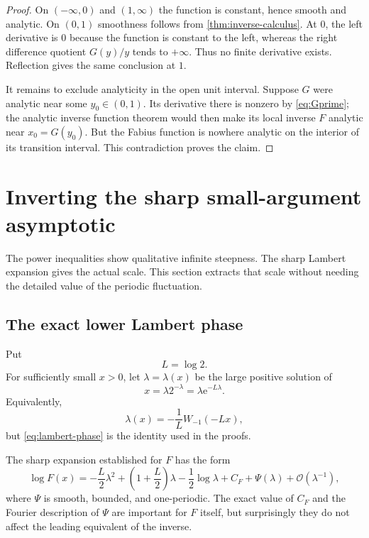 \documentclass[11pt,oneside]{article}
\theoremstyle{definition}
\theoremstyle{remark}
\newcommand{\e}{\mathrm e}
\newcommand{\bigO}{\mathcal O}
\newcommand{\InvF}{G}
\begin{document}
\begin{proof}
On $(-\infty,0)$ and $(1,\infty)$ the function is constant, hence smooth
and analytic.  On $(0,1)$ smoothness follows from
\cref{thm:inverse-calculus}.  At $0$, the left derivative is $0$ because
the function is constant to the left, whereas the right difference
quotient $\InvF(y)/y$ tends to $+\infty$.  Thus no finite derivative
exists.  Reflection gives the same conclusion at $1$.

It remains to exclude analyticity in the open unit interval.  Suppose
$\InvF$ were analytic near some $y_0\in(0,1)$.  Its derivative there is
nonzero by \eqref{eq:Gprime}; the analytic inverse function theorem would
then make its local inverse $F$ analytic near $x_0=\InvF(y_0)$.  But the
Fabius function is nowhere analytic on the interior of its transition
interval.  This contradiction proves the claim.
\end{proof}

\section{Inverting the sharp small-argument asymptotic}
\label{sec:inverse-asymptotic}

The power inequalities show qualitative infinite steepness.  The sharp
Lambert expansion gives the actual scale.  This section extracts that
scale without needing the detailed value of the periodic fluctuation.

\subsection{The exact lower Lambert phase}

Put
\[
 L=\log2.
\]
For sufficiently small $x>0$, let $\lambda=\lambda(x)$ be the large
positive solution of
\begin{equation}
 x=\lambda2^{-\lambda}
   =\lambda\e^{-L\lambda}. \label{eq:lambert-phase}
\end{equation}
Equivalently,
\[
 \lambda(x)=-\frac1L W_{-1}(-Lx),
\]
but \eqref{eq:lambert-phase} is the identity used in the proofs.

The sharp expansion established for $F$ has the form
\begin{equation}
 \log F(x)
 =-\frac L2\lambda^2+
   \left(1+\frac L2\right)\lambda
   -\frac12\log\lambda
   +C_F+\Psi(\lambda)
   +\bigO(\lambda^{-1}), \label{eq:sharp-input}
\end{equation}
where $\Psi$ is smooth, bounded, and one-periodic.  The exact value of
$C_F$ and the Fourier description of $\Psi$ are important for $F$ itself,
but surprisingly they do not affect the leading equivalent of the
inverse.
\end{document}
